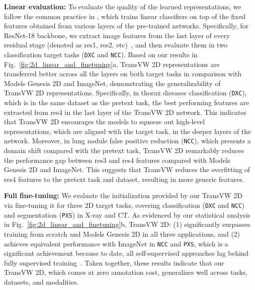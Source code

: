 \documentclass[journal,twoside,web]{ieeecolor}
\def\figurename{Fig.}
\begin{document}
\smallskip
 \noindent\textbf{Linear evaluation:} To evaluate the quality of the learned representations, we follow the common practice in \cite{Zhan2020Online,goyal2019scaling}, which trains linear classifiers on top of the fixed features obtained from  various layers of  the pre-trained networks. Specifically, for ResNet-18 backbone, we extract image features from the last layer of every  residual  stage (denoted as res1, res2, etc)~\cite{goyal2019scaling}, and then  evaluate  them in two classification target tasks (\texttt{DXC} and  \texttt{NCC}).
Based on our results in \figurename~\ref{fig:2d_linear_and_finetuning}a, TransVW 2D representations are transferred better across all the layers on both target tasks in comparison with Models Genesis 2D and ImageNet, demonstrating the generalizability of TransVW 2D representations. Specifically, in thorax diseases classification (\texttt{DXC}), which is in the same dataset as the pretext task, the best performing features are extracted from  res4  in the last layer of the TransVW 2D network. This indicates that  TransVW 2D encourages the models to squeeze out high-level representations, which are aligned with the target task, in the deeper layers of the network. Moreover, in lung nodule false positive reduction (\texttt{NCC}), which presents a domain shift compared with the pretext task, TransVW 2D remarkably reduces the performance gap between res3 and res4 features compared with  Models Genesis 2D and ImageNet. This suggests that TransVW reduces the overfitting of res4 features to the pretext task and dataset, resulting in more generic features.

\smallskip
\noindent\textbf{Full fine-tuning:} We evaluate the initialization provided by our TransVW 2D via fine-tuning it for three  2D target  tasks,  covering  classification  (\texttt{DXC} and \texttt{NCC})  and  segmentation  (\texttt{PXS})  in  X-ray  and  CT.
As evidenced by our statistical analysis in \figurename~\ref{fig:2d_linear_and_finetuning}b,  TransVW 2D: (1) significantly surpasses training from scratch and Models Genesis 2D in all three applications, and (2) achieves equivalent performance with ImageNet in \texttt{NCC} and \texttt{PXS}, which is a significant achievement because to date, all self-supervised approaches lag behind fully supervised training~\cite{hendrycks2019using,caron2019unsupervised,zhang2019aet}. Taken together, these results indicate that  our TransVW 2D, which comes at zero annotation cost, generalizes well across tasks, datasets, and modalities.  
 
\end{document}
